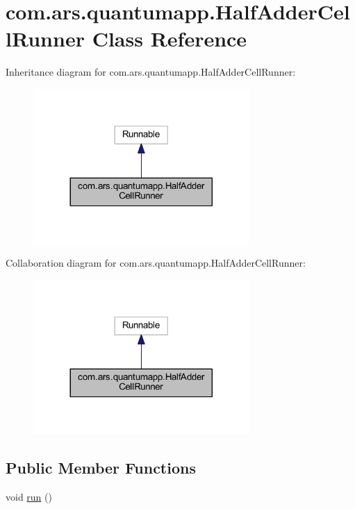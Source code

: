 \hypertarget{classcom_1_1ars_1_1quantumapp_1_1_half_adder_cell_runner}{}\section{com.\+ars.\+quantumapp.\+Half\+Adder\+Cell\+Runner Class Reference}
\label{classcom_1_1ars_1_1quantumapp_1_1_half_adder_cell_runner}


Inheritance diagram for com.\+ars.\+quantumapp.\+Half\+Adder\+Cell\+Runner\+:\nopagebreak
\begin{figure}[H]
\begin{center}
\leavevmode
\includegraphics[width=233pt]{classcom_1_1ars_1_1quantumapp_1_1_half_adder_cell_runner__inherit__graph}
\end{center}
\end{figure}


Collaboration diagram for com.\+ars.\+quantumapp.\+Half\+Adder\+Cell\+Runner\+:\nopagebreak
\begin{figure}[H]
\begin{center}
\leavevmode
\includegraphics[width=233pt]{classcom_1_1ars_1_1quantumapp_1_1_half_adder_cell_runner__coll__graph}
\end{center}
\end{figure}
\subsection*{Public Member Functions}
\begin{DoxyCompactItemize}
\item 
void \hyperlink{classcom_1_1ars_1_1quantumapp_1_1_half_adder_cell_runner_a4f4ba989df2058187640a1868856c0c7}{run} ()
\end{DoxyCompactItemize}


